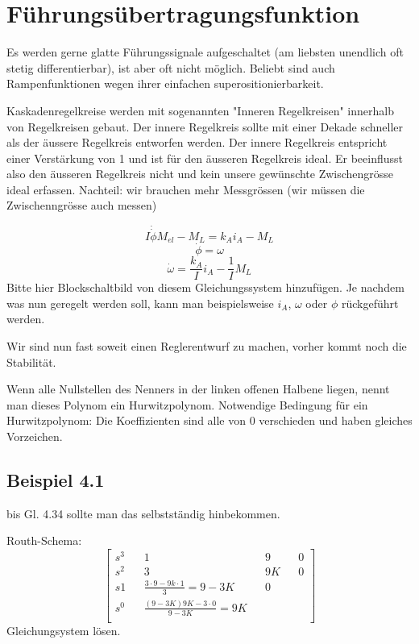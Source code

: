 \documentclass[a4paper]{article}
\begin{document}
 \section*{Führungsübertragungsfunktion}
 
Es werden gerne glatte Führungssignale aufgeschaltet (am liebsten unendlich oft stetig differentierbar), ist aber oft nicht möglich. Beliebt sind auch Rampenfunktionen wegen ihrer einfachen superositionierbarkeit.

Kaskadenregelkreise werden mit sogenannten "Inneren Regelkreisen" innerhalb von Regelkreisen gebaut. Der innere Regelkreis sollte mit einer Dekade schneller als der äussere Regelkreis entworfen werden. Der innere Regelkreis entspricht einer Verstärkung von 1 und ist für den äusseren Regelkreis ideal. Er beeinflusst also den äusseren Regelkreis nicht und kein unsere gewünschte Zwischengrösse ideal erfassen. Nachteil: wir brauchen mehr Messgrössen (wir müssen die Zwischenngrösse auch messen)

\[ I \dot\dot\phi M_{el}-M_{L}=k_{A}i_{A}-M_{L} \]
\[ \dot\phi=\omega \]
\[ \dot\omega=\frac{k_{A}}{I}i_{A}-\frac{1}{I}M_{L} \]
Bitte hier Blockschaltbild von diesem Gleichungssystem hinzufügen.
Je nachdem was nun geregelt werden soll, kann man beispielsweise $i_{A}$, $\omega$ oder $\phi$ rückgeführt werden.

Wir sind nun fast soweit einen Reglerentwurf zu machen, vorher kommt noch die Stabilität.

Wenn alle Nullstellen des Nenners in der linken offenen Halbene liegen, nennt man dieses Polynom ein Hurwitzpolynom.
Notwendige Bedingung für ein Hurwitzpolynom: Die Koeffizienten sind alle von 0 verschieden und haben gleiches Vorzeichen.

\subsection*{Beispiel 4.1}
bis Gl. 4.34 sollte man das selbstständig hinbekommen.

Routh-Schema:
\[ \begin{bmatrix}
s^{3} && 1 && 9 && 0\\
s^{2} && 3 && 9K && 0\\
s1 && \frac{3\cdot 9-9k\cdot 1}{3}=9-3K && 0\\
s^{0} && \frac{(9-3K)9K-3\cdot 0}{9-3K}=9K\\
\end{bmatrix}  \]
Gleichungsystem lösen.
\end{document}
